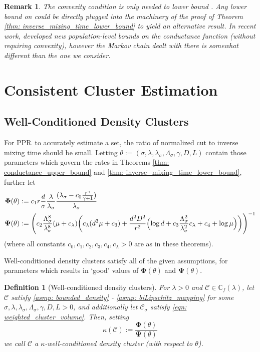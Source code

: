 \documentclass{article}
\newcommand{\1}{\mathbf{1}}
\newcommand{\Phibf}{\mathbf{\Phi}}
\newcommand{\Psibf}{\mathbf{\Psi}}
\newcommand{\Pbb}{\mathbb{P}}
\newcommand{\Cbb}{\mathbb{C}}
\newcommand{\Cset}{\mathcal{C}}
\newcommand{\Csig}{\Cset_{\sigma}}
\newcommand{\pprspace}{{\sc PPR~}}
\theoremstyle{aldenthm}
\newtheorem{definition}{Definition}
\theoremstyle{aldenrmrk}
\newtheorem{remark}{Remark}
\begin{document}
\begin{remark}
  The convexity condition is only needed to lower bound 
  \smash{$\widetilde{\Phi}_{\Pbb,r}$}. Any lower bound on
  \smash{$\widetilde{\Phi}_{\Pbb,r}$} could be directly plugged into the 
  machinery of the proof of Theorem \ref{thm: inverse_mixing_time_lower_bound}
  to yield an alternative result. In recent work, \citep{abbasi-yadkori2016} developed new
  population-level bounds on the conductance function (without requiring
  convexity), however the Markov chain dealt with there is somewhat different 
  than the one we consider.    
\end{remark}

\section{Consistent Cluster Estimation}
\label{sec: consistent_cluster_estimation_with_ppr}

\subsection{Well-Conditioned Density Clusters}

For \pprspace to accurately estimate a set, the ratio of normalized cut to inverse mixing time should be small. Letting $\theta := (\sigma, \lambda, \lambda_{\sigma}, \Lambda_{\sigma}, \gamma, D, L)$ contain those parameters which govern the rates in Theorems \ref{thm: conductance_upper_bound} and \ref{thm: inverse_mixing_time_lower_bound}, further let
\begin{align*}
\mathbf{\Phi}(\theta) 
& := c_1 r \frac{d}{\sigma} \frac{\lambda}{\lambda_{\sigma}} \frac{(\lambda_{\sigma} - c_0 \frac{r^{\gamma}}{\gamma + 1})}{\lambda_{\sigma}} \\
\mathbf{\Psi}(\theta) & := \Biggl(c_2 \frac{\Lambda_{\sigma}^8}{\lambda_{\sigma}^8} (\mu + c_{\lambda}) \biggl( c_{\lambda}(d^3 \mu + c_3) + \frac{d^2D^2}{r^2} \Bigl( \log d + c_3 \frac{\Lambda_{\sigma}^2}{\lambda_{\sigma}^2} c_{\lambda} + c_4 + \log \mu \Bigr) \biggr) \Biggr)^{-1}
\end{align*}
(where all constants $c_0,c_1,c_2,c_3,c_4,c_\lambda>0$ are as in these 
theorems).

Well-conditioned density clusters satisfy all of the given assumptions, for parameters which results in `good' values of $\Phibf(\theta)$ and $\Psibf(\theta)$.
\begin{definition}[Well-conditioned density clusters]
	For $\lambda > 0$ and $\Cset \in \Cbb_f(\lambda)$, let $\Cset$ satisfy \ref{asmp: bounded_density} - \ref{asmp: biLipschitz_mapping} for some $\sigma, \lambda, \lambda_{\sigma}, \Lambda_{\sigma}, \gamma, D, L > 0$, and additionally let $\Csig$ satisfy \eqref{eqn: weighted_cluster_volume}. Then, setting
	\begin{equation*}
	\kappa(\Cset) := \frac{\mathbf{\Phi}(\theta)}{\mathbf{\Psi}(\theta)}
	\end{equation*}
	we call $\Cset$ a \textrm{$\kappa$-well-conditioned density cluster (with respect to $\theta$).}
\end{definition}
\end{document}
